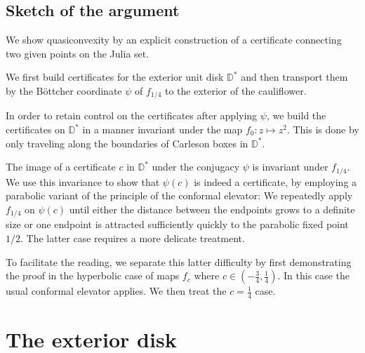 \subsection{Sketch of the argument}

We show quasiconvexity by an explicit construction of a certificate connecting two given points on the Julia set.

We first build certificates for the exterior unit disk $\mathbb D ^*$ and then transport them by the Böttcher coordinate $\psi$ of $f_{1/4}$ to the exterior of the cauliflower.

In order to retain control on the certificates after applying $\psi$, we build the certificates on $\mathbb D^*$ in a manner invariant under the map $f_0: z\mapsto z^2$. This is done by only traveling along the boundaries of Carleson boxes in $\mathbb D^{*}$. 

The image of a certificate $c$ in $\mathbb D^{*}$ under the conjugacy $\psi$ is invariant under $f_{1/4}$. We use this invariance to show that $\psi(c)$ is indeed a certificate, by employing a parabolic variant of the principle of the conformal elevator: We repeatedly apply $f_{1/4}$ on $\psi(c)$ until either the distance between the endpoints grows to a definite size or one endpoint is attracted sufficiently quickly to the parabolic fixed point $1/2$. The latter case requires a more delicate treatment.

To facilitate the reading, we separate this latter difficulty by first demonstrating the proof in the hyperbolic case of maps $f_c$ where  $c\in\left(-\frac 34,\frac{1}{4}\right)$. In this case the usual conformal elevator applies. We then treat the $c=\frac 14$ case.



\section{The exterior disk}

\begin{comment}
The exterior $\D^{*}=\left\{ \left|z\right|>1\right\} $ of the unit
disk is trivially quasiconvex by connecting points along the perimeter of the circle. However, these paths follow the boundary too closely and their length would blow up if we transport them to the exterior of $\mathcal{J}(f_{c})$, $c\neq0$, via the Riemann map. Instead,
\end{comment}

